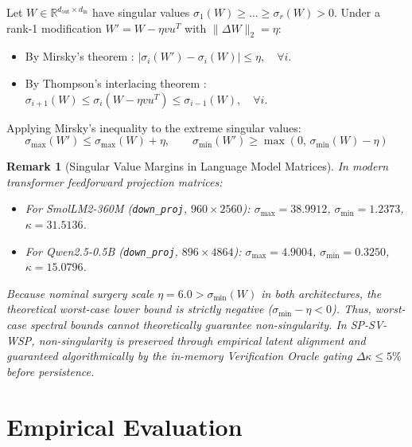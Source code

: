 \documentclass[11pt,a4paper]{article}
\newtheorem{remark}{Remark}
\begin{document}
Let $W \in \mathbb{R}^{d_{\text{out}} \times d_{\text{in}}}$ have singular values $\sigma_1(W) \ge \dots \ge \sigma_r(W) > 0$. Under a rank-1 modification $W' = W - \eta v u^T$ with $\|\Delta W\|_2 = \eta$:
\begin{itemize}
    \item By Mirsky's theorem \cite{mirsky1960symmetric}: $|\sigma_i(W') - \sigma_i(W)| \le \eta, \quad \forall i$.
    \item By Thompson's interlacing theorem \cite{thompson1976behavior}: $\sigma_{i+1}(W) \le \sigma_i(W - \eta v u^T) \le \sigma_{i-1}(W), \quad \forall i$.
\end{itemize}

Applying Mirsky's inequality to the extreme singular values:
\begin{equation}
\sigma_{\max}(W') \le \sigma_{\max}(W) + \eta, \qquad \sigma_{\min}(W') \ge \max(0, \, \sigma_{\min}(W) - \eta)
\end{equation}

\begin{remark}[Singular Value Margins in Language Model Matrices]
In modern transformer feedforward projection matrices:
\begin{itemize}
    \item For SmolLM2-360M (\texttt{down\_proj}, $960 \times 2560$): $\sigma_{\max} = 38.9912$, $\sigma_{\min} = 1.2373$, $\kappa = 31.5136$.
    \item For Qwen2.5-0.5B (\texttt{down\_proj}, $896 \times 4864$): $\sigma_{\max} = 4.9004$, $\sigma_{\min} = 0.3250$, $\kappa = 15.0796$.
\end{itemize}
Because nominal surgery scale $\eta = 6.0 > \sigma_{\min}(W)$ in both architectures, the theoretical worst-case lower bound is strictly negative ($\sigma_{\min} - \eta < 0$). Thus, worst-case spectral bounds cannot theoretically guarantee non-singularity. In SP-SV-WSP, non-singularity is preserved through empirical latent alignment and guaranteed algorithmically by the in-memory Verification Oracle gating $\Delta \kappa \le 5\%$ before persistence.
\end{remark}

\section{Empirical Evaluation}
\end{document}
